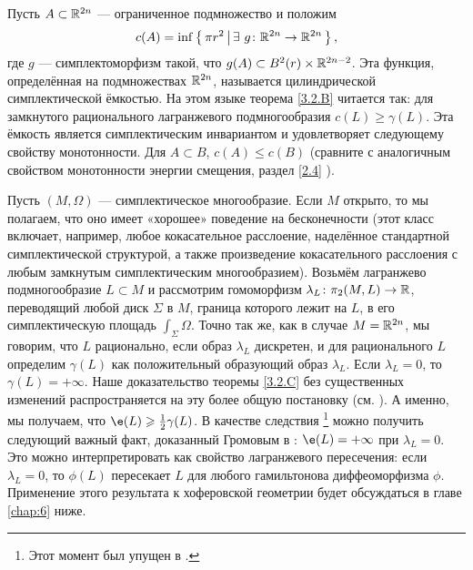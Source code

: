 \begin{thm}{}\label{3.2.F}
\end{thm}

Пусть $A \subset \mathbb{R}^{2n}$ --- ограниченное подмножество и положим 
\[c(A) = \inf \left\{ \,{\pi r^2}\, \middle| \,{ \exists\  g\colon \mathbb{R}^{2n} \to \mathbb{R}^{2n}}\, \right\},\]
где $g$ --- симплектоморфизм такой, что $g (A) \subset B^2 (r) \times \mathbb{R}^{2n - 2}$.
Эта функция, определённая на подмножествах $\mathbb{R}^{2n}$, называется цилиндрической симплектической ёмкостью.
На этом языке теорема \ref{3.2.B} читается так:
для замкнутого рационального лагранжевого подмногообразия $c(L) \ge \gamma (L)$.
Эта ёмкость является симплектическим инвариантом и удовлетворяет следующему свойству монотонности.
Для $A \subset B$, $c (A) \le c (B)$ (сравните с аналогичным свойством монотонности энергии смещения, раздел \ref{2.4} ).

\begin{thm}{}\label{3.2.G}
\end{thm}

Пусть $(M, \Omega)$ --- симплектическое многообразие.
Если $M$ открыто, то мы полагаем, что оно имеет «хорошее» поведение на бесконечности (этот класс включает, например, любое кокасательное расслоение, наделённое стандартной симплектической структурой, а также произведение кокасательного расслоения с любым замкнутым симплектическим многообразием).
Возьмём лагранжево подмногообразие $L \subset M$ и рассмотрим гомоморфизм $\lambda_L\colon \pi_2 (M, L) \to \mathbb{R}$, переводящий любой диск $\Sigma$ в $M$, граница которого лежит на $L$, в его симплектическую площадь $\int_\Sigma \Omega$.
Точно так же, как в случае $M = \mathbb{R}^{2n}$, мы говорим, что $L$ рационально, если образ $\lambda_L$ дискретен, и для рационального $L$ определим $\gamma (L)$ как положительный образующий образ $\lambda_L$.
Если $\lambda_L = 0$, то  $\gamma (L) = + \infty$.
Наше доказательство теоремы \ref{3.2.C} без существенных изменений распространяется на эту более общую постановку (см. \cite{P1}).
А именно, мы получаем, что $\e (L) \ge \tfrac12 \gamma (L)$.
В качестве следствия%
\footnote{Этот момент был упущен в \cite[с. 359]{P1}.}
можно получить следующий важный факт, доказанный Громовым в \cite{G1}: $\e (L) = + \infty$ при $\lambda_L = 0$.
Это можно интерпретировать как свойство лагранжевого пересечения: если $\lambda_L = 0$, то $\phi (L)$ пересекает $L$ для любого гамильтонова диффеоморфизма $\phi$.
Применение этого результата к хоферовской геометрии будет обсуждаться в главе \ref{chap:6} ниже.

